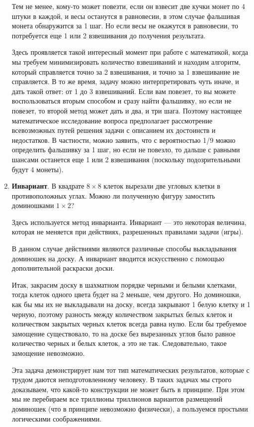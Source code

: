 \begin{enumerate}
Тем не менее, кому-то может повезти, если он взвесит две кучки монет по 4 штуки в каждой, и весы останутся в равновесии, в этом случае фальшивая монета обнаружится за 1 шаг. Но если весы не окажутся в равновесии, то потребуется еще 1 или 2 взвешивания до получения результата.

Здесь проявляется такой интересный момент при работе с математикой, когда мы требуем минимизировать количество взвешиваний и находим алгоритм, который справляется точно за 2 взвешивания, и точно за 1 взвешивание не справляется. В то же время, задачу можно интерпретировать чуть иначе, и дать такой ответ: от 1 до 3 взвешиваний. Если вам повезет, то вы можете воспользоваться вторым способом и сразу найти фальшивку, но если не повезет, то второй метод может дать и два, и три шага. Поэтому настоящее математическое исследование вопроса предполагает рассмотрение всевозможных путей решения задачи с описанием их достоинств и недостатков. В частности, можно заявить, что с вероятностью 1/9 можно определить фальшивку за 1 шаг, но если не повезло, то дальше с равными шансами останется еще 1 или 2 взвешивания (поскольку подозрительными будут 4 монеты).

\item \textbf{Инвариант}. В квадрате $8\times 8$ клеток вырезали две угловых клетки в противоположных углах. Можно ли полученную фигуру замостить доминошками $1\times 2$?

Здесь используется метод инварианта. Инвариант --- это некоторая величина, которая не меняется при действиях, разрешенных правилами задачи (игры).

В данном случае действиями являются различные способы выкладывания доминошек на доску. А инвариант вводится искусственно с помощью дополнительной раскраски доски.

Итак, закрасим доску в шахматном порядке черными и белыми клетками, тогда клеток одного цвета будет на 2 меньше, чем другого. Но доминошки, как бы мы их не выкладывали на доску, всегда закрывают 1 белую клетку и 1 черную, поэтому разность между количеством закрытых белых клеток и количеством закрытых черных клеток всегда равна нулю. Если бы требуемое замощение существовало, то на доске без вырезанных углов было равное количество черных и белых клеток, а это не так. Следовательно, такое замощение невозможно.

Эта задача демонстрирует нам тот тип математических результатов, которые с трудом даются неподготовленному человеку. В таких задачах мы строго доказываем, что какой-то конструкции не может быть в принципе. При этом мы не перебираем все триллионы триллионов вариантов размещений доминошек (что в принципе невозможно физически), а пользуемся простыми логическими соображениями.

\end{enumerate}




